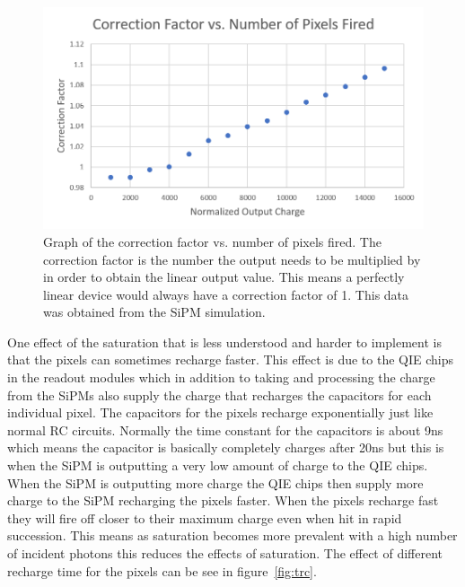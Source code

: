 \begin{figure}
\centering
\includegraphics[width=\linewidth]{Figures/CorFac.png}
\caption{Graph of the correction factor vs. number of pixels fired. The correction factor is the number the output needs to be multiplied by in order to obtain the linear output value. This means a perfectly linear device would always have a correction factor of 1. This data was obtained from the SiPM simulation.}
\label{fig:Cor}
\end{figure}

One effect of the saturation that is less understood and harder to implement is that the pixels can sometimes recharge faster. This effect is due to the QIE chips in the readout modules which in addition to taking and processing the charge from the SiPMs also supply the charge that recharges the capacitors for each individual pixel. The capacitors for the pixels recharge exponentially just like normal RC circuits. Normally the time constant for the capacitors is about 9ns which means the capacitor is basically completely charges after 20ns but this is when the SiPM is outputting a very low amount of charge to the QIE chips. When the SiPM is outputting more charge the QIE chips then supply more charge to the SiPM recharging the pixels faster. When the pixels recharge fast they will fire off closer to their maximum charge even when hit in rapid succession. This means as saturation becomes more prevalent with a high number of incident photons this reduces the effects of saturation. The effect of different recharge time for the pixels can be see in figure~\ref{fig:trc}.

